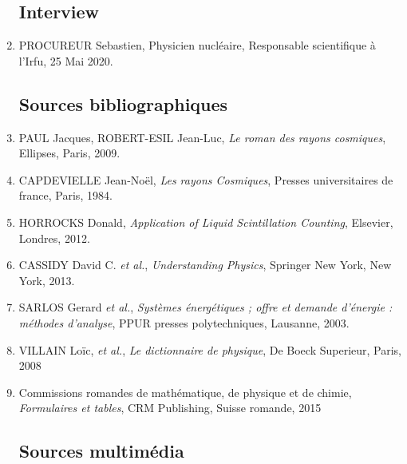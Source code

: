 \documentclass[a4paper, 12pt]{article}
\begin{document}
\begin{spacing}{1.5}
\begin{enumerate}
\subsection{Interview}

  \item PROCUREUR Sebastien, Physicien nucléaire, Responsable scientifique à l'Irfu, 25 Mai 2020.


\subsection{Sources bibliographiques}


  \item PAUL Jacques, ROBERT-ESIL Jean-Luc, \emph{Le roman des rayons cosmiques}, Ellipses, Paris, 2009.
  \item CAPDEVIELLE Jean-Noël, \emph{Les rayons Cosmiques}, Presses universitaires de france, Paris, 1984.
  \item HORROCKS Donald, \emph{Application of Liquid Scintillation Counting}, Elsevier, Londres, 2012.
  \item CASSIDY  David C. \emph{et al.}, \emph{Understanding Physics}, Springer New York, New York, 2013.
  \item SARLOS Gerard \emph{et al.}, \emph{Systèmes énergétiques ; offre et demande d'énergie : méthodes d'analyse}, PPUR presses polytechniques, Lausanne, 2003.
  \item VILLAIN Loïc, \emph{et al.}, \emph{Le dictionnaire de physique}, De Boeck Superieur, Paris, 2008
  \item Commissions romandes de mathématique, de physique et de chimie, \emph{Formulaires et tables}, CRM Publishing, Suisse romande, 2015

\subsection{Sources multimédia}


\end{enumerate}
\end{spacing}
\end{document}
